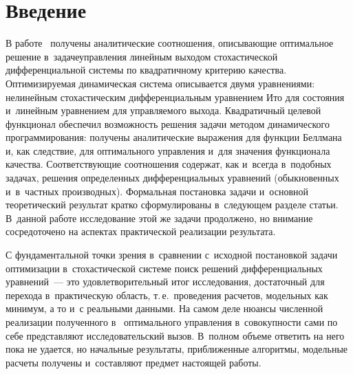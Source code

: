 
  
\vspace*{-4pt}



\thispagestyle{headings}

\begin{multicols}{2}

\label{st\stat}

\section{Введение}
     
     В работе~\cite{1-b} получены аналитические соотноше\-ния, 
описывающие оптимальное решение в~задаче\linebreak управления линейным выходом 
стохастической дифференциальной системы по квадратичному критерию 
качества. Оптимизируемая динамическая система описывается двумя 
уравнениями: нелинейным стохастическим дифференциальным уравнением 
Ито для состояния и~линейным уравнением для управляемого выхода. 
Квадратичный целевой функционал обеспечил возможность решения задачи 
методом динамического программирования: получены аналитические 
выражения для функции Беллмана и, как следствие, для оптимального 
управления и~для значения функционала качества. Соответствующие 
соотношения содержат, как и~всегда в~подобных задачах, решения 
определенных дифференциальных уравнений (обыкновенных и~в~частных 
производных). Формальная постановка задачи и~основной теоретический 
результат кратко сформулированы в~следующем разделе статьи. В~данной 
работе исследование этой же задачи продолжено, но внимание сосредоточено 
на аспектах практической реализации результата.
     
     С фундаментальной точки зрения в~сравнении с~исходной постановкой 
задачи оптимизации в~стохастической системе поиск решений 
дифференциальных уравнений~--- это удовлетворительный итог 
исследования, достаточный для перехода в~практическую область, т.\,е.\ 
проведения расчетов, модельных как минимум, а то и~с реальными данными. 
На самом деле нюансы численной реализации полученного в~\cite{1-b} 
оптимального управления в~совокупности сами по себе представляют 
исследовательский вызов. В~полном объеме ответить на него пока не 
удается, но начальные результаты, приближенные алгоритмы, модельные 
расчеты получены и~составляют предмет настоящей работы. 


\end{multicols}
